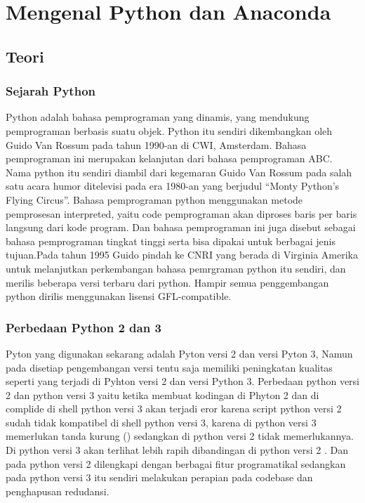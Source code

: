 \chapter{Mengenal Python dan Anaconda}

\section{Teori}
\subsection{Sejarah Python}
Python adalah bahasa pemprograman yang dinamis, yang mendukung pemprograman berbasis suatu objek. Python itu sendiri dikembangkan oleh Guido Van Rossum pada tahun 1990-an di CWI, Amsterdam. Bahasa pemprograman ini merupakan kelanjutan dari bahasa pemprograman ABC. Nama python itu sendiri diambil dari kegemaran Guido Van Rossum pada salah satu acara humor ditelevisi pada era 1980-an yang berjudul “Monty Python’s Flying Circus”. Bahasa pemprograman python menggunakan metode pemprosesan interpreted, yaitu code pemprograman akan diproses baris per baris langsung dari kode program. Dan bahasa pemprograman ini juga disebut sebagai bahasa pemprograman tingkat tinggi serta bisa dipakai untuk berbagai jenis tujuan.Pada tahun 1995 Guido pindah ke CNRI yang berada di Virginia Amerika untuk melanjutkan perkembangan bahasa pemrgraman python itu sendiri, dan merilis beberapa versi terbaru dari python. Hampir semua penggembangan python dirilis menggunakan lisensi GFL-compatible. 
\subsection{Perbedaan Python 2 dan 3}
\par 
Pyton yang digunakan sekarang adalah Pyton versi 2 dan versi Pyton 3, Namun pada disetiap pengembangan versi tentu saja memiliki peningkatan kualitas seperti yang terjadi di Pyhton versi 2 dan versi Python 3. Perbedaan python versi 2 dan python versi 3 yaitu ketika membuat kodingan di Phyton 2 dan di complide di shell python versi 3 akan terjadi eror karena script python versi 2 sudah tidak kompatibel di shell python versi 3, karena di python versi 3 memerlukan tanda kurung () sedangkan di python versi 2 tidak memerlukannya. Di python versi 3 akan terlihat lebih rapih dibandingan di python versi 2 . Dan pada python versi 2 dilengkapi dengan berbagai fitur programatikal sedangkan pada python versi 3 itu sendiri melakukan perapian pada codebase dan penghapusan redudansi.

